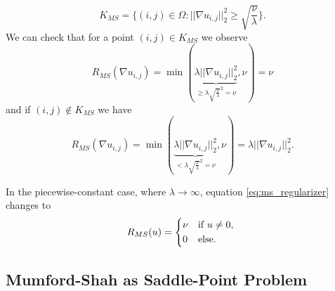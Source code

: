         \begin{equation}
            K_{MS} = \bigg\{ (i, j) \in \Omega : ||\nabla u_{i, j}||_{2}^{2} \ge \sqrt{\frac{\nu}{\lambda}} \bigg\}.
        \label{eq:set_k_ms}
        \end{equation}
    We can check that for a point $(i, j) \in K_{MS}$ we observe
        $$
            R_{MS}(\nabla u_{i, j}) = \min(\underbrace{\lambda||\nabla u_{i, j}||_{2}^{2}}_{\ge \lambda \sqrt{\frac{\nu}{\lambda}}^{2} = \nu}, \nu) = \nu
        $$
    and if $(i, j) \notin K_{MS}$ we have
        $$
            R_{MS}(\nabla u_{i, j}) = \min(\underbrace{\lambda||\nabla u_{i, j}||_{2}^{2}}_{< \lambda \sqrt{\frac{\nu}{\lambda}}^{2} = \nu}, \nu) = \lambda||\nabla u_{i, j}||_{2}^{2}.
        $$

    \begin{remark}
        In the piecewise-constant case, where $\lambda \longrightarrow \infty$, equation \ref{eq:ms_regularizer} changes to
            \begin{equation}
                R_{MS}(u) = 
                    \begin{dcases*}
                        \nu & \textnormal{if $u \ne 0$,} \\
                        0 & \textnormal{else}.
                    \end{dcases*}
            \label{eq:ms_regularizer_piecewise_constant}
            \end{equation}
    \end{remark}

    \subsection{Mumford-Shah as Saddle-Point Problem} %
    \label{sub:mumford_shah_as_saddle_point_problem}

